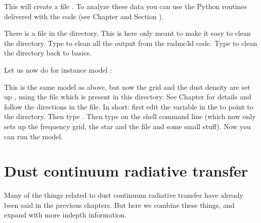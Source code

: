\documentclass[letterpaper,10pt,english]{sphinxmanual}
\begin{document}
This will create a file .  To analyze these data you can use the
Python routines delivered with the code (see Chapter
{\hyperref[\detokenize{pythontools:chap-python-analysis-tools}]{}} and Section {\hyperref[\detokenize{installation:sec-install-pythonscripts}]{}}).

There is a file  in the directory. This is here only meant to make
it easy to clean the directory. Type  to clean all the output
from the radmc3d code. Type  to clean the directory back to
basics.

Let us now do for instance model :

\begin{sphinxVerbatim}[commandchars=\\\{\}]
 
\end{sphinxVerbatim}

This is the same model as above, but now the grid and the dust density are set
up  , using the file  which is
present in this directory.  See Chapter {\hyperref[\detokenize{internalsetup:chap-internal-setup}]{}} for details
and follow the directions in the  file. In short: first edit the
variable  in the  to point to the  directory. Then
type . Then type  on the shell command line
(which now only sets up the frequency grid, the star and the 
file and some small stuff). Now you can run the model.



\chapter{Dust continuum radiative transfer}
\label{\detokenize{dustradtrans:dust-continuum-radiative-transfer}}\label{\detokenize{dustradtrans:chap-dust-transfer}}\label{\detokenize{dustradtrans::doc}}
Many of the things related to dust continuum radiative transfer have
already been said in the previous chapters. But here we combine these
things, and expand with more in\sphinxhyphen{}depth information.
\end{document}
